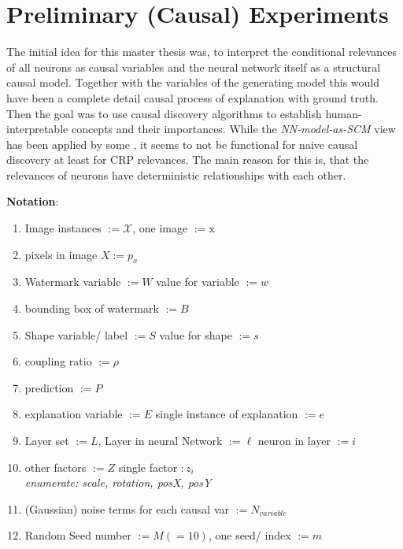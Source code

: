 { \color{gray}
\section{Preliminary (Causal) Experiments}
The initial idea for this master thesis was, to interpret the conditional relevances of all neurons as causal variables and the neural network itself as a structural causal model. Together with the variables of the generating model this would have been a complete detail causal process of explanation with ground truth. Then the goal was to use causal discovery algorithms to establish human-interpretable concepts and their importances. While the \textit{NN-model-as-SCM} view has been applied by some \cite{Narendra2018,Chattopadhyay2019}, it seems to not be functional for naive causal discovery at least for CRP relevances. The main reason for this is, that the relevances of neurons have deterministic relationships with each other. 
} 
\vspace{1cm}

{\color{codepurple} 
\textbf{Notation}:
\begin{enumerate}
    \item Image instances $:= \mathcal{X}$, one image $:= \mathrm{x}$
    \item pixels in image $X := p_x$
    \item Watermark variable $:= W$ value for variable $:= w$
    \item bounding box of watermark $:= B$
    \item Shape variable/ label $:= S$ value for shape $:= s$
    \item coupling ratio $:= \rho$
    \item prediction $:= P$
    \item explanation variable $:= E$ single instance of explanation $:= e$
    \item Layer set $:= L$, Layer in neural Network $:= \ell$ neuron in layer $:= i$
    \item other factors $:= Z$ single factor $:z_i$ \\ 
    \textit{enumerate: scale, rotation, posX, posY}
    \item (Gaussian) noise terms for each causal var $:= N_{variable}$
    \item Random Seed number $:= M (=10)$, one seed/ index $:=m$
    
\end{enumerate}


}